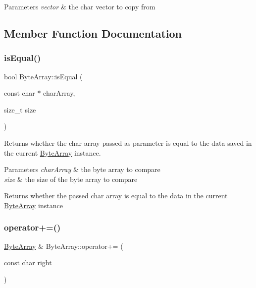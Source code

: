 \begin{DoxyParams}{Parameters}
{\em vector} & the char vector to copy from \\
\hline
\end{DoxyParams}


\subsection{Member Function Documentation}
\mbox{\label{class_byte_array_a4c0af1c1fe9ee1e6fa1e8ce7b0bde83a}} 
\subsubsection{\texorpdfstring{isEqual()}{isEqual()}}
{\footnotesize\ttfamily bool Byte\+Array\+::is\+Equal (\begin{DoxyParamCaption}\item[{const char $\ast$}]{char\+Array,  }\item[{size\+\_\+t}]{size }\end{DoxyParamCaption})}



Returns whether the char array passed as parameter is equal to the data saved in the current \mbox{\hyperlink{class_byte_array}{Byte\+Array}} instance. 


\begin{DoxyParams}{Parameters}
{\em char\+Array} & the byte array to compare \\
\hline
{\em size} & the size of the byte array to compare \\
\hline
\end{DoxyParams}
\begin{DoxyReturn}{Returns}
whether the passed char array is equal to the data in the current \mbox{\hyperlink{class_byte_array}{Byte\+Array}} instance 
\end{DoxyReturn}
\mbox{\label{class_byte_array_aa8900e73d7ba3cea9aca18d037a2d017}} 
\subsubsection{\texorpdfstring{operator+=()}{operator+=()}\hspace{0.1cm}{\footnotesize\ttfamily [1/2]}}
{\footnotesize\ttfamily \mbox{\hyperlink{class_byte_array}{Byte\+Array}} \& Byte\+Array\+::operator+= (\begin{DoxyParamCaption}\item[{const char}]{right }\end{DoxyParamCaption})}



